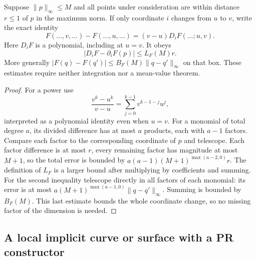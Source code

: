 \begin{lemma}
\label{tan:divided}
Suppose $\|p\|_\infty\le M$ and all points under consideration are
within distance $r\le1$ of $p$ in the maximum norm. If only coordinate
$i$ changes from $u$ to $v$, write the exact identity
\[
 F(\ldots,v,\ldots)-F(\ldots,u,\ldots)
          =(v-u)D_iF(\ldots;u,v).
\]
Here $D_iF$ is a polynomial, including at $u=v$. It obeys
\[
 |D_iF-\partial_iF(p)|\le L_F(M)r.
\]
More generally $|F(q)-F(q')|\le B_F(M)\|q-q'\|_\infty$
on that box. These estimates require neither integration nor a
mean-value theorem.
\end{lemma}
\begin{proof}
For a power use
\[
 \frac{v^k-u^k}{v-u}=\sum_{j=0}^{k-1}v^{k-1-j}u^j,
\]
interpreted as a polynomial identity even when $u=v$. For a monomial
of total degree $a$, its divided difference has at most $a$ products,
each with $a-1$ factors. Compare each factor to the corresponding
coordinate of $p$ and telescope. Each factor difference is at most
$r$, every remaining factor has magnitude at most $M+1$, so the
total error is bounded by
$a(a-1)(M+1)^{\max(a-2,0)}r$. The definition of $L_F$ is a larger
bound after multiplying by coefficients and summing. For the second
inequality telescope directly in all factors of each monomial:
its error is at most $a(M+1)^{\max(a-1,0)}\|q-q'\|_\infty$.
Summing is bounded by $B_F(M)$. This last estimate bounds the whole
coordinate change, so no missing factor of the dimension is needed.
\end{proof}

\subsection{A local implicit curve or surface with a PR constructor}


